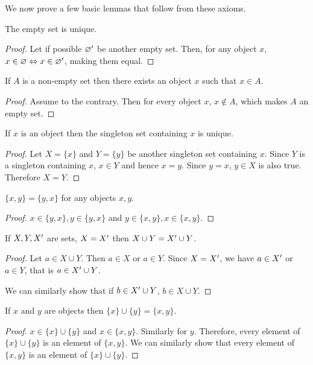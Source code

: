 We now prove a few basic lemmas that follow from these axioms.
\begin{lem}\label{c2s1l1}
The empty set is unique.
\end{lem}
\begin{proof}
Let if possible $\varnothing^\prime$ be another empty set. Then, for any 
object $x$, $x \in \varnothing \Leftrightarrow x \in \varnothing^\prime$,
making them equal.
\end{proof}

\begin{lem}\label{c2s1l2}
If $A$ is a non-empty set then there exists an object $x$ such that $x \in
A$.
\end{lem}
\begin{proof}
Assume to the contrary. Then for every object $x$, $x \notin A$, which 
makes $A$ an empty set.
\end{proof}

\begin{lem}\label{c2s1l3}
If $x$ is an object then the singleton set containing $x$ is unique.
\end{lem}
\begin{proof}
Let $X = \{x\}$ and $Y = \{y\}$ be another singleton set containing $x$.
Since $Y$ is a singleton containing $x$, $x \in Y$ and hence $x = y$. Since
$y = x$, $y \in X$ is also true. Therefore $X = Y$.
\end{proof}

\begin{lem}\label{c2s1l4}
$\{x, y\} = \{y, x\}$ for any objects $x, y$.
\end{lem}
\begin{proof}
$x \in \{y, x\}, y \in \{y, x\}$ and $y \in \{x, y\}, x \in \{x, y\}$.
\end{proof}

\begin{lem}\label{c2s1l5}
If $X, Y, X^\prime$ are sets, $X = X^\prime$ then $X \cup Y = X^\prime \cup Y$.
\end{lem}
\begin{proof}
Let $a \in X \cup Y$. Then $a \in X$ or $a \in Y$. Since $X = X^\prime$, we
have $a \in X^\prime$ or $a \in Y$, that is $a \in X^\prime \cup Y$.

We can similarly show that if $b \in X^\prime \cup Y$, $b \in X \cup Y$.
\end{proof}

\begin{lem}\label{c2s1l6}
If $x$ and $y$ are objects then $\{x\} \cup \{y\} = \{x, y\}$.
\end{lem}
\begin{proof}
$x \in \{x\} \cup \{y\}$ and $x \in \{x, y\}$. Similarly for $y$. 
Therefore, every element of $\{x\} \cup \{y\}$ is an element of $\{x, y\}$.
We can similarly show that every element of $\{x, y\}$ is an element of
$\{x\} \cup \{y\}$.
\end{proof}


